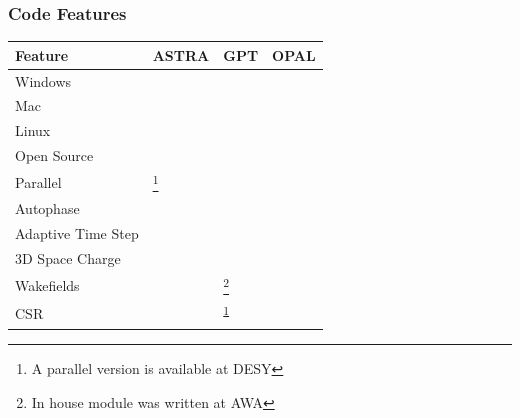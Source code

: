 \documentclass{beamer}
\newcommand{\cmark}{\ding{51}}%
\newcommand{\xmark}{\ding{55}}%
\begin{document}
\begin{frame}
	\frametitle{Code Features}
	\begin{table}\centering
		\begin{tabular}{l l l l}
			\toprule
			\textbf{Feature} & \textbf{ASTRA} & \textbf{GPT} & \textbf{OPAL}\\
			\midrule
			Windows     		& \cmark & \cmark & \xmark \\ 
			Mac         		& \cmark & \cmark & \cmark \\
			Linux       		& \cmark & \cmark & \cmark \\
			Open Source 		& \xmark & \xmark & \cmark \\
			Parallel    		& \xmark\footnote[1]{A parallel version is available at DESY} & \xmark & \cmark \\
			Autophase   		& \cmark & \xmark & \cmark \\
			Adaptive Time Step 	& \xmark & \cmark & \xmark \\
			3D Space Charge 	& \cmark & \cmark & \cmark \\
			Wakefields  		& \cmark & \xmark\footnote[2]{In house module was written at AWA\label{note2}} & \cmark \\
			CSR         		& \xmark & \xmark\textsuperscript{\ref{note2}} & \cmark \\
			\bottomrule
		\end{tabular}
	\end{table}
\end{frame}
\end{document}
